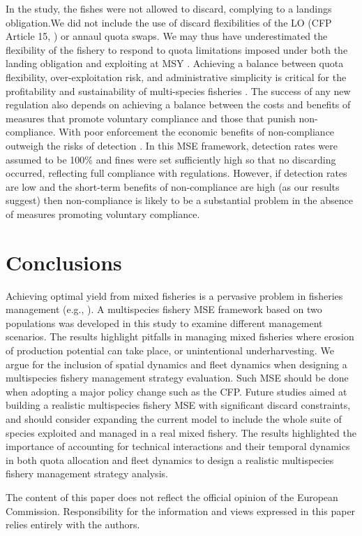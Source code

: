 \documentclass[12pt,oneline,a4paper,numbib]{ouparticle}
\numberwithin{equation}{subsection} %
\begin{document}
In the study, the fishes were not allowed to discard, complying to a landings obligation.We did not include the use of discard flexibilities of the LO (CFP Article 15, \cite{CFP2013}) or annaul quota swaps. We may thus have underestimated the flexibility of the fishery to respond to quota limitations imposed under both the landing obligation and exploiting at MSY \cite{Prellezo2016}. Achieving a balance between quota flexibility, over-exploitation risk, and administrative simplicity is critical for the profitability and sustainability of multi-species fisheries \cite{Alzorriz2018}. The success of any new regulation also depends on achieving a balance between the costs and benefits of measures that promote voluntary compliance and those that punish non-compliance. With poor enforcement the economic benefits of non-compliance outweigh the risks of detection \cite{Batsleer2013}. In this MSE framework, detection rates were assumed to be 100\% and fines were set sufficiently high so that no discarding occurred, reflecting full compliance with regulations. However, if detection rates are low and the short-term benefits of non-compliance are high (as our results suggest) then non-compliance is likely to be a substantial problem in the absence of measures promoting voluntary compliance. 

\section{Conclusions}

Achieving optimal yield from mixed fisheries is a pervasive problem in fisheries management (e.g., \cite{Farcas2016, Prellezo2016b, Salomon2014, Ulrich2017, Voss2014}). A multispecies fishery MSE framework based on two populations was developed in this study to examine different management scenarios. The results highlight pitfalls in managing mixed fisheries where erosion of production potential can take place, or unintentional underharvesting. We argue for the inclusion of spatial dynamics and fleet dynamics when designing a multispecies fishery management strategy evaluation. Such MSE should be done when adopting a major policy change such as the CFP. Future studies aimed at building a realistic multispecies fishery MSE with significant discard constraints, and should consider expanding the current model to include the whole suite of species exploited and managed in a real mixed fishery. The results highlighted the importance of accounting for technical interactions and their temporal dynamics in both quota allocation and fleet dynamics to design a realistic multispecies fishery management strategy analysis.


\begin{notes}[Acknowledgements]
The content of this paper does not reflect the official opinion of the European Commission. Responsibility for the information and views expressed in this paper relies entirely with the authors.
\end{notes}



\end{document}
